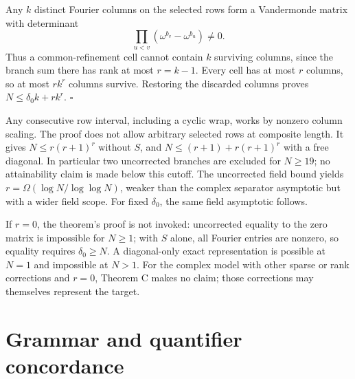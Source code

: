 \documentclass[
  11pt,
]{article}
\begin{document}
Any \(k\) distinct Fourier columns on the selected rows form a
Vandermonde matrix with determinant \[
 \prod_{u<v}(\omega^{b_v}-\omega^{b_u})\ne0.
\] Thus a common-refinement cell cannot contain \(k\) surviving columns,
since the branch sum there has rank at most \(r=k-1\). Every cell has at
most \(r\) columns, so at most \(rk^r\) columns survive. Restoring the
discarded columns proves \(N\le\delta_0k+rk^r\). \(\square\)

Any consecutive row interval, including a cyclic wrap, works by nonzero
column scaling. The proof does not allow arbitrary selected rows at
composite length. It gives \(N\le r(r+1)^r\) without \(S\), and
\(N\le(r+1)+r(r+1)^r\) with a free diagonal. In particular two
uncorrected branches are excluded for \(N\ge19\); no attainability claim
is made below this cutoff. The uncorrected field bound yields
\(r=\Omega(\log N/\log\log N)\), weaker than the complex separator
asymptotic but with a wider field scope. For fixed \(\delta_0\), the
same field asymptotic follows.

If \(r=0\), the theorem's proof is not invoked: uncorrected equality to
the zero matrix is impossible for \(N\ge1\); with \(S\) alone, all
Fourier entries are nonzero, so equality requires \(\delta_0\ge N\). A
diagonal-only exact representation is possible at \(N=1\) and impossible
at \(N>1\). For the complex model with other sparse or rank corrections
and \(r=0\), Theorem C makes no claim; those corrections may themselves
represent the target.

\section{Grammar and quantifier
concordance}\label{grammar-and-quantifier-concordance}
\end{document}
